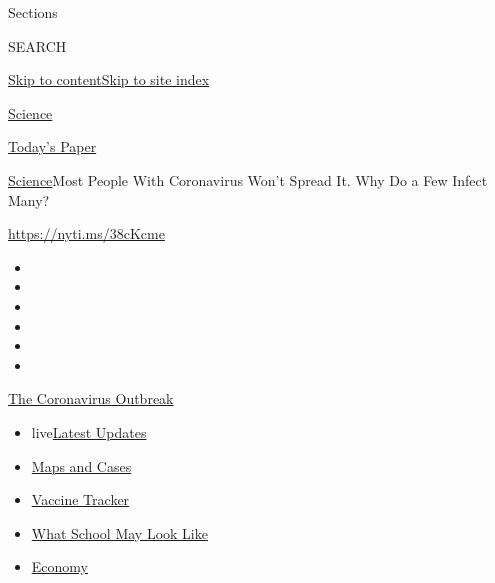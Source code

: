 Sections

SEARCH

\protect\hyperlink{site-content}{Skip to
content}\protect\hyperlink{site-index}{Skip to site index}

\href{https://www.nytimes.com/section/science}{Science}

\href{https://myaccount.nytimes.com/auth/login?response_type=cookie\&client_id=vi}{}

\href{https://www.nytimes.com/section/todayspaper}{Today's Paper}

\href{/section/science}{Science}\textbar{}Most People With Coronavirus
Won't Spread It. Why Do a Few Infect Many?

\url{https://nyti.ms/38cKcme}

\begin{itemize}
\item
\item
\item
\item
\item
\item
\end{itemize}

\href{https://www.nytimes.com/news-event/coronavirus?action=click\&pgtype=Article\&state=default\&region=TOP_BANNER\&context=storylines_menu}{The
Coronavirus Outbreak}

\begin{itemize}
\tightlist
\item
  live\href{https://www.nytimes.com/2020/08/01/world/coronavirus-covid-19.html?action=click\&pgtype=Article\&state=default\&region=TOP_BANNER\&context=storylines_menu}{Latest
  Updates}
\item
  \href{https://www.nytimes.com/interactive/2020/us/coronavirus-us-cases.html?action=click\&pgtype=Article\&state=default\&region=TOP_BANNER\&context=storylines_menu}{Maps
  and Cases}
\item
  \href{https://www.nytimes.com/interactive/2020/science/coronavirus-vaccine-tracker.html?action=click\&pgtype=Article\&state=default\&region=TOP_BANNER\&context=storylines_menu}{Vaccine
  Tracker}
\item
  \href{https://www.nytimes.com/interactive/2020/07/29/us/schools-reopening-coronavirus.html?action=click\&pgtype=Article\&state=default\&region=TOP_BANNER\&context=storylines_menu}{What
  School May Look Like}
\item
  \href{https://www.nytimes.com/live/2020/07/31/business/stock-market-today-coronavirus?action=click\&pgtype=Article\&state=default\&region=TOP_BANNER\&context=storylines_menu}{Economy}
\end{itemize}

